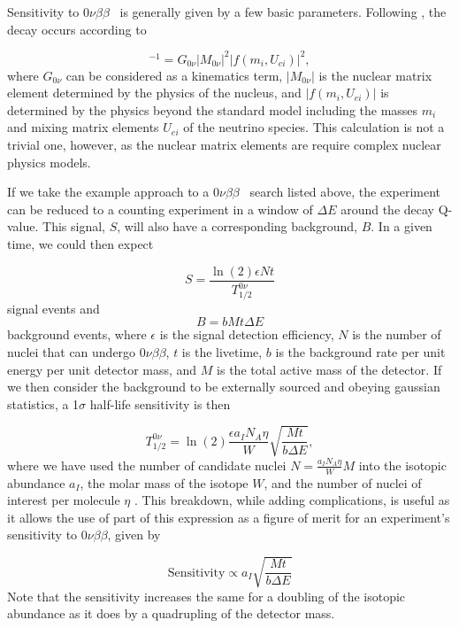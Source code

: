 \documentclass[12pt,a4paper]{article}
\newcommand{\zeronubb}{$0\nu \beta \beta$}
\begin{document}
Sensitivity to \zeronubb~ is generally given by a few basic parameters. Following \cite{Barea:2013bz}, the decay occurs according to

\begin{equation}
[\tau^{0\nu}_{1/2}]^{-1} = G_{0\nu}|M_{0\nu}|^2|f(m_i,U_{ei})|^2,
\end{equation}
where $G_{0\nu}$ can be considered as a kinematics term, $|M_{0\nu}|$ is the nuclear matrix element determined by the physics of the nucleus, and $|f(m_i,U_{ei})|$ is determined by the physics beyond the standard model including the masses $m_i$ and mixing matrix elements $U_{ei}$ of the neutrino species. This calculation is not a trivial one, however, as the nuclear matrix elements are require complex nuclear physics models. 

If we take the example approach to a \zeronubb~ search listed above, the experiment can be reduced to a counting experiment in a window of $\Delta E$ around the decay Q-value. This signal, $S$, will also have a corresponding background, $B$. In a given time, we could then expect 

\begin{equation}
S = \frac{\ln(2)\epsilon Nt}{T^{0\nu}_{1/2}}
\end{equation}
signal events and 
\begin{equation}
B = bMt\Delta E
\end{equation} 
background events, where $\epsilon$ is the signal detection efficiency, $N$ is the number of nuclei that can undergo \zeronubb, $t$ is the livetime, $b$ is the background rate per unit energy per unit detector mass, and $M$ is the total active mass of the detector. If we then consider the background to be externally sourced and obeying gaussian statistics, a 1$\sigma$ half-life sensitivity is then

\begin{equation}
T^{0\nu}_{1/2} = \ln(2)\frac{\epsilon a_I N_A \eta}{W} \sqrt{\frac{Mt}{b\Delta E}},
\end{equation}
where we have used the number of candidate nuclei $N = \frac{a_I N_A \eta}{W}M$ into the isotopic abundance $a_I$, the molar mass of the isotope $W$, and the number of nuclei of interest per molecule $\eta$ \cite{Alessandria:2011rc}. This breakdown, while adding complications, is useful as it allows the use of part of this expression as a figure of merit for an experiment's sensitivity to \zeronubb, given by

\begin{equation}
\textrm{Sensitivity} \propto a_I \sqrt{\frac{Mt}{b\Delta E}}
\end{equation}
Note that the sensitivity increases the same for a doubling of the isotopic abundance as it does by a quadrupling of the detector mass.
\end{document}

